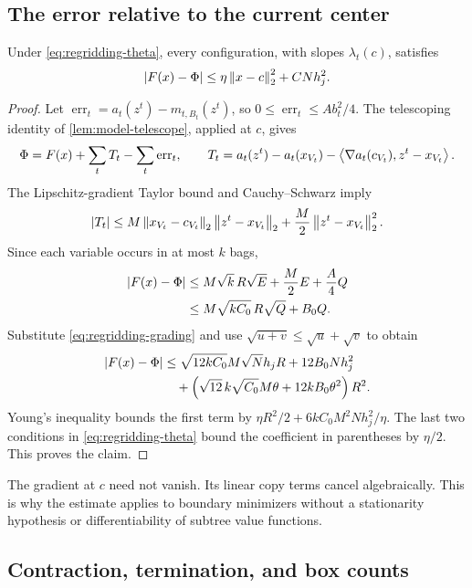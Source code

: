\subsection{The error relative to the current center}

\begin{lemma}\label{lem:regridding-error}
Under \eqref{eq:regridding-theta}, every configuration, with slopes
$\lambda_t(c)$, satisfies
\begin{equation}\label{eq:regridding-error}
 \left\lvert F(x)-\Phi\right\rvert\le\eta\left\lVert x-c\right\rVert_2^2+CNh_j^2.
\end{equation}
\end{lemma}

\begin{proof}
Let $\operatorname{err}_t=a_t(z^t)-m_{t,B_t}(z^t)$, so
$0\le\operatorname{err}_t\le Ab_t^2/4$. The telescoping identity
of \cref{lem:model-telescope}, applied at $c$, gives
\[
 \Phi=F(x)+\sum_tT_t-\sum_t\operatorname{err}_t,
 \qquad
 T_t=a_t(z^t)-a_t(x_{V_t})-
         \left\langle \nabla a_t(c_{V_t}),z^t-x_{V_t}\right\rangle.
\]
The Lipschitz-gradient Taylor bound and Cauchy--Schwarz imply
\[
 \left\lvert T_t\right\rvert\le
 M\left\lVert x_{V_t}-c_{V_t}\right\rVert_2\left\lVert z^t-x_{V_t}\right\rVert_2
 +\frac M2\left\lVert z^t-x_{V_t}\right\rVert_2^2.
\]
Since each variable occurs in at most $k$ bags,
\[
\begin{split}
 \left\lvert F(x)-\Phi\right\rvert
 &\le M\sqrt{k}\,R\sqrt E+\frac M2E+\frac A4Q\\
 &\le M\sqrt{kC_0}\,R\sqrt Q+B_0Q.
\end{split}
\]
Substitute \eqref{eq:regridding-grading} and use
$\sqrt{u+v}\le\sqrt u+\sqrt v$ to obtain
\[
\begin{split}
 \left\lvert F(x)-\Phi\right\rvert
 &\le\sqrt{12kC_0}M\sqrt N h_jR+12B_0Nh_j^2\\
 &\quad+
 \left(\sqrt{12}\,k\sqrt{C_0}M\theta
               +12kB_0\theta^2\right)R^2.
\end{split}
\]
Young's inequality bounds the first term by
$\eta R^2/2+6kC_0M^2Nh_j^2/\eta$. The last two conditions in
\eqref{eq:regridding-theta} bound the coefficient in parentheses
by $\eta/2$. This proves the claim.
\end{proof}

The gradient at $c$ need not vanish. Its linear copy terms cancel
algebraically. This is why the estimate applies to boundary minimizers
without a stationarity hypothesis or differentiability of subtree
value functions.

\subsection{Contraction, termination, and box counts}


